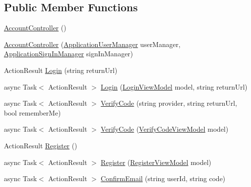 \subsection*{Public Member Functions}
\begin{DoxyCompactItemize}
\item 
\mbox{\hyperlink{class_brew_day2_1_1_controllers_1_1_account_controller_a3754bc6fe622589b24b8c63d1dae507e}{Account\+Controller}} ()
\item 
\mbox{\hyperlink{class_brew_day2_1_1_controllers_1_1_account_controller_ac924bf46d64f8af1443b1f396bc9d462}{Account\+Controller}} (\mbox{\hyperlink{class_brew_day2_1_1_application_user_manager}{Application\+User\+Manager}} user\+Manager, \mbox{\hyperlink{class_brew_day2_1_1_application_sign_in_manager}{Application\+Sign\+In\+Manager}} sign\+In\+Manager)
\item 
Action\+Result \mbox{\hyperlink{class_brew_day2_1_1_controllers_1_1_account_controller_af8e566f39adc2233dd4794944d163d31}{Login}} (string return\+Url)
\item 
async Task$<$ Action\+Result $>$ \mbox{\hyperlink{class_brew_day2_1_1_controllers_1_1_account_controller_ad9ad8a905a83621d78d4687554dde812}{Login}} (\mbox{\hyperlink{class_brew_day2_1_1_models_1_1_login_view_model}{Login\+View\+Model}} model, string return\+Url)
\item 
async Task$<$ Action\+Result $>$ \mbox{\hyperlink{class_brew_day2_1_1_controllers_1_1_account_controller_a54da1c7b1c864774aaf9836ec2bbbe53}{Verify\+Code}} (string provider, string return\+Url, bool remember\+Me)
\item 
async Task$<$ Action\+Result $>$ \mbox{\hyperlink{class_brew_day2_1_1_controllers_1_1_account_controller_ab108ec42c6f813474bd73ad47650e463}{Verify\+Code}} (\mbox{\hyperlink{class_brew_day2_1_1_models_1_1_verify_code_view_model}{Verify\+Code\+View\+Model}} model)
\item 
Action\+Result \mbox{\hyperlink{class_brew_day2_1_1_controllers_1_1_account_controller_af3f9f544eb4078c5964867d54bc17c75}{Register}} ()
\item 
async Task$<$ Action\+Result $>$ \mbox{\hyperlink{class_brew_day2_1_1_controllers_1_1_account_controller_a0eccb71c2436cd83f24364fae3cbbe8c}{Register}} (\mbox{\hyperlink{class_brew_day2_1_1_models_1_1_register_view_model}{Register\+View\+Model}} model)
\item 
async Task$<$ Action\+Result $>$ \mbox{\hyperlink{class_brew_day2_1_1_controllers_1_1_account_controller_a85707c0c29d5d31427b2d9be10ce74bc}{Confirm\+Email}} (string user\+Id, string code)

\end{DoxyCompactItemize}
